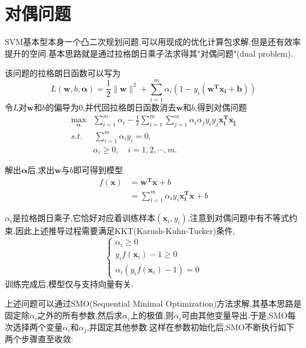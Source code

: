 \section{对偶问题}

SVM基本型本身一个凸二次规划问题,可以用现成的优化计算包求解.但是还有效率提升的空间.基本思路就是通过拉格朗日乘子法求得其"对偶问题"(dual problem).

该问题的拉格朗日函数可以写为
\begin{equation}L(\mathbf w, b, \mathbf\alpha)=\frac{1}{2}\|\mathbf w\|^2+\sum_{i=1}^m\alpha_i(1-y_i(\mathbf{w^Tx_i+b}))\end{equation}
令$L$对$\mathbf w$和$b$的偏导为$0$,并代回拉格朗日函数消去$\mathbf w$和$b$,得到对偶问题
\begin{equation}\begin{split}
\max_{\mathbf\alpha}&\sum_{i=1}^m\alpha_i-\frac{1}{2}\sum_{i=1}^m\sum_{j=1}^m\alpha_i\alpha_jy_iy_j\mathbf{x_i^Tx_j}\\
s.t.&\,\sum_{i=1}^m\alpha_iy_i=0,\\
&\alpha_i\ge 0,\quad i=1,2,\cdots,m.
\end{split}\end{equation}

解出$\mathbf\alpha$后,求出$\mathbf w$与$b$即可得到模型
\begin{equation}\begin{split}
f(\mathbf x)&=\mathbf{w^Tx}+b\\
&=\sum_{i=1}^m\alpha_iy_i\mathbf{x_i^Tx}+b
\end{split}\end{equation}

$\alpha_i$是拉格朗日乘子,它恰好对应着训练样本$(\mathbf x_i,y_i)$,注意到对偶问题中有不等式约束,因此上述推导过程需要满足KKT(Karush-Kuhn-Tucker)条件,
\begin{equation}\left\{\begin{array}{ll}
\alpha_i\ge 0\\
y_if(\mathbf x_i)-1\ge 0\\
\alpha_i(y_if(\mathbf x_i)-1)=0
\end{array}\right.\end{equation}
训练完成后,模型仅与支持向量有关.

上述问题可以通过SMO(Sequential Minimal Optimization)方法求解,其基本思路是固定除$\alpha_i$之外的所有参数,然后求$\alpha_i$上的极值,则$\alpha_i$可由其他变量导出.于是,SMO每次选择两个变量$\alpha_i$和$\alpha_j$,并固定其他参数.这样在参数初始化后,SMO不断执行如下两个步骤直至收敛:

